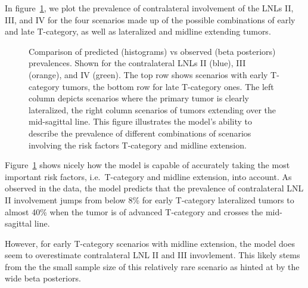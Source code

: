 \documentclass[
  sn-mathphys-num,
]{sn-jnl}
\begin{document}
In figure~\ref{fig-model-prevalences-overall}, we plot the prevalence of
contralateral involvement of the LNLs II, III, and IV for the four
scenarios made up of the possible combinations of early and late
T-category, as well as lateralized and midline extending tumors.

\begin{figure}


\caption{\label{fig-model-prevalences-overall}Comparison of predicted
(histograms) vs observed (beta posteriors) prevalences. Shown for the
contralateral LNLs II (blue), III (orange), and IV (green). The top row
shows scenarios with early T-category tumors, the bottom row for late
T-category ones. The left column depicts scenarios where the primary
tumor is clearly lateralized, the right column scenarios of tumors
extending over the mid-sagittal line. This figure illustrates the
model's ability to describe the prevalence of different combinations of
scenarios involving the risk factors T-category and midline extension.}

\end{figure}%

Figure~\ref{fig-model-prevalences-overall} shows nicely how the model is
capable of accurately taking the most important risk factors,
i.e.~T-category and midline extension, into account. As observed in the
data, the model predicts that the prevalence of contralateral LNL II
involvement jumps from below 8\% for early T-category lateralized tumors
to almost 40\% when the tumor is of advanced T-category and crosses the
mid-sagittal line.

However, for early T-category scenarios with midline extension, the
model does seem to overestimate contralateral LNL II and III
invovlement. This likely stems from the the small sample size of this
relatively rare scenario as hinted at by the wide beta posteriors.
\end{document}
